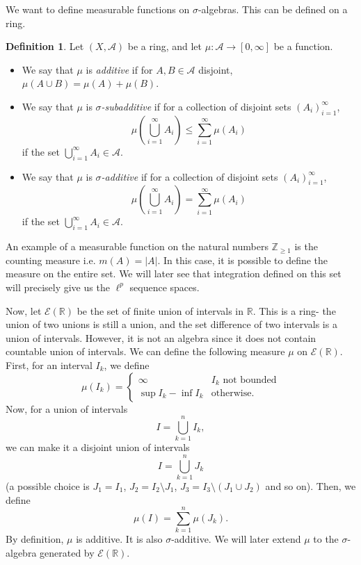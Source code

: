 \documentclass[a4paper, openany]{memoir}
\theoremstyle{definition}
\newtheorem{definition}{Definition}[section]
\theoremstyle{plain}
\begin{document}
    We want to define measurable functions on $\sigma$-algebras. This can be defined on a ring.
    \begin{definition}
        Let $(X, \mathcal{A})$ be a ring, and let $\mu \colon \mathcal{A} \to [0, \infty]$ be a function.
        \begin{itemize}
            \item We say that $\mu$ is \emph{additive} if for $A, B \in \mathcal{A}$ disjoint, $\mu(A \cup B) = \mu(A) + \mu(B)$.
            \item We say that $\mu$ is \emph{$\sigma$-subadditive} if for a collection of disjoint sets $(A_i)_{i=1}^\infty$,
            \[\mu \left(\bigcup_{i=1}^\infty A_i\right) \leq \sum_{i=1}^\infty \mu(A_i)\]
            if the set $\bigcup_{i=1}^\infty A_i \in \mathcal{A}$.
            \item We say that $\mu$ is \emph{$\sigma$-additive} if for a collection of disjoint sets $(A_i)_{i=1}^\infty$,
            \[\mu \left(\bigcup_{i=1}^\infty A_i\right) = \sum_{i=1}^\infty \mu(A_i)\]
            if the set $\bigcup_{i=1}^\infty A_i \in \mathcal{A}$.
        \end{itemize}
    \end{definition}
    An example of a measurable function on the natural numbers $\mathbb{Z}_{\geq 1}$ is the counting measure i.e. $m(A) = |A|$. In this case, it is possible to define the measure on the entire set. We will later see that integration defined on this set will precisely give us the $\ell^p$ sequence spaces.

    Now, let $\mathcal{E}(\mathbb{R})$ be the set of finite union of intervals in $\mathbb{R}$. This is a ring- the union of two unions is still a union, and the set difference of two intervals is a union of intervals. However, it is not an algebra since it does not contain countable union of intervals. We can define the following measure $\mu$ on $\mathcal{E}(\mathbb{R})$. First, for an interval $I_k$, we define
    \[\mu(I_k) = \begin{cases}
        \infty & I_k \textrm{ not bounded} \\
        \sup I_k - \inf I_k & \textrm{otherwise}.
    \end{cases}\]
    Now, for a union of intervals
    \[I = \bigcup_{k=1}^n I_k,\]
    we can make it a disjoint union of intervals
    \[I = \bigcup_{k=1}^n J_k\]
    (a possible choice is $J_1 = I_1$, $J_2 = I_2 \setminus J_1$, $J_3 = I_3 \setminus (J_1 \cup J_2)$ and so on). Then, we define
    \[\mu(I) = \sum_{k=1}^n \mu(J_k).\]
    By definition, $\mu$ is additive. It is also $\sigma$-additive. We will later extend $\mu$ to the $\sigma$-algebra generated by $\mathcal{E}(\mathbb{R})$.
\end{document}
